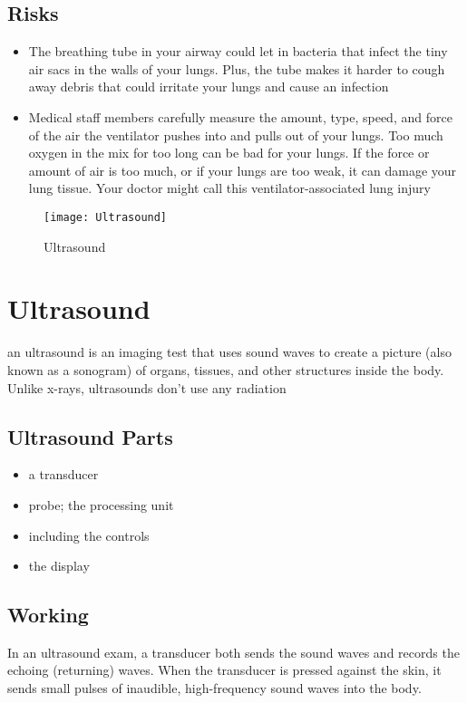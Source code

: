 \documentclass[12pt]{article}
\begin{document}
 \subsection{Risks}
 \begin{itemize}
 
 
 \item The breathing tube in your airway could let in bacteria that infect the tiny air sacs in the walls of your lungs. Plus, the tube makes it harder to cough away debris that could irritate your lungs and cause an infection
 \item Medical staff members carefully measure the amount, type, speed, and force of the air the ventilator pushes into and pulls out of your lungs. Too much oxygen in the mix for too long can be bad for your lungs. If the force or amount of air is too much, or if your lungs are too weak, it can damage your lung tissue. Your doctor might call this ventilator-associated lung injury
 
 \end{itemize}
 \begin{figure}
\centering
\texttt{[image: Ultrasound]}
\caption{Ultrasound}
\end{figure}
 \section{Ultrasound}
an ultrasound is an imaging test that uses sound waves to create a picture (also known as a sonogram) of organs, tissues, and other structures inside the body. Unlike x-rays, ultrasounds don't use any radiation

\subsection{Ultrasound Parts}

\begin{itemize}
\item a transducer
\item probe; the processing unit
\item including the controls
\item the display
\end{itemize}
\subsection{Working}
 In an ultrasound exam, a transducer both sends the sound waves and records the echoing (returning) waves. When the transducer is pressed against the skin, it sends small pulses of inaudible, high-frequency sound waves into the body.
\end{document}
